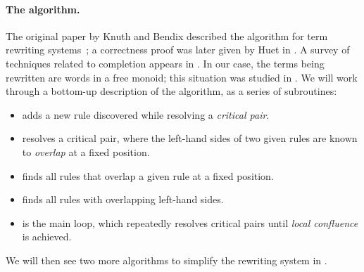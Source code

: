 \documentclass[../generics]{subfiles}
\begin{document}
\paragraph{The algorithm.}  The original paper by Knuth and Bendix described the algorithm for term rewriting systems~\cite{Knuth1983}; a correctness proof was later given by Huet in \cite{HUET198111}. A survey of techniques related to completion appears in \cite{BUCHBERGER19873}. In our case, the terms being rewritten are words in a free monoid; this situation was studied in \cite{narendran}. We will work through a bottom-up description of the algorithm, as a series of subroutines:
\begin{itemize}
\item {} adds a new rule discovered while resolving a \emph{critical pair}.
\item {} resolves a critical pair, where the left-hand sides of two given rules are known to \emph{overlap} at a fixed position.
\item {} finds all rules that overlap a given rule at a fixed position.
\item {} finds all rules with overlapping left-hand sides.
\item {} is the main loop, which repeatedly resolves critical pairs until \emph{local confluence} is achieved.
\end{itemize}
We will then see two more algorithms to simplify the rewriting system in .
\end{document}
